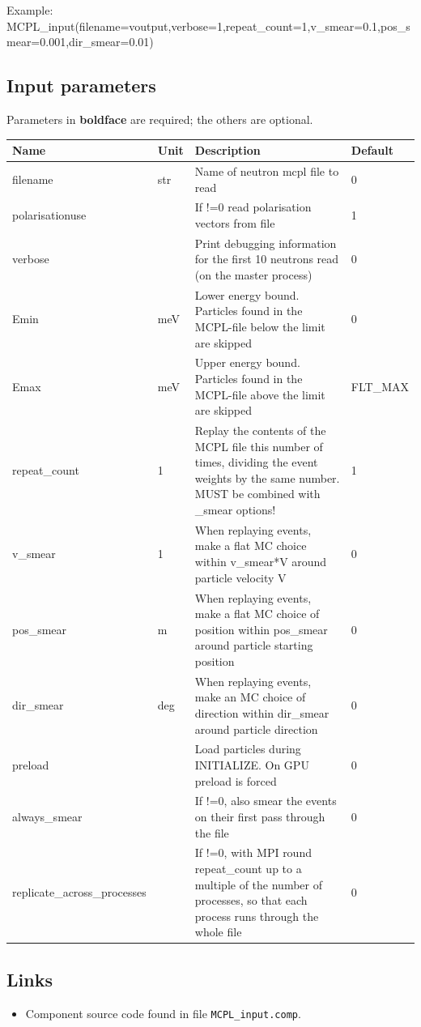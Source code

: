 Example: MCPL\_input(filename=voutput,verbose=1,repeat\_count=1,v\_smear=0.1,pos\_smear=0.001,dir\_smear=0.01)

\subsection*{Input parameters}
Parameters in \textbf{boldface} are required; the others are optional.

\begin{longtable}{p{}p{}p{}p{}}
\toprule
\textbf{Name} & \textbf{Unit} & \textbf{Description} & \textbf{Default} \\
\midrule
\endhead
filename & str & Name of neutron mcpl file to read & 0 \\
polarisationuse &   & If !=0 read polarisation vectors from file & 1 \\
verbose &   & Print debugging information for the first 10 neutrons read (on the master process) & 0 \\
Emin & meV & Lower energy bound. Particles found in the MCPL-file below the limit are skipped & 0 \\
Emax & meV & Upper energy bound. Particles found in the MCPL-file above the limit are skipped & FLT\_MAX \\
repeat\_count & 1 & Replay the contents of the MCPL file this number of times, dividing the event weights by the same number. MUST be combined with \_smear options! & 1 \\
v\_smear & 1 & When replaying events, make a flat MC choice within v\_smear*V around particle velocity V & 0 \\
pos\_smear & m & When replaying events, make a flat MC choice of position within pos\_smear around particle starting position & 0 \\
dir\_smear & deg & When replaying events, make an MC choice of direction within dir\_smear around particle direction & 0 \\
preload &   & Load particles during INITIALIZE. On GPU preload is forced & 0 \\
always\_smear &   & If !=0, also smear the events on their first pass through the file & 0 \\
replicate\_across\_processes &   & If !=0, with MPI round repeat\_count up to a multiple of the number of processes, so that each process runs through the whole file & 0 \\
\bottomrule
\end{longtable}

\subsection*{Links}
\begin{itemize}
  \item Component source code found in file \texttt{MCPL\_input.comp}.
\end{itemize}
